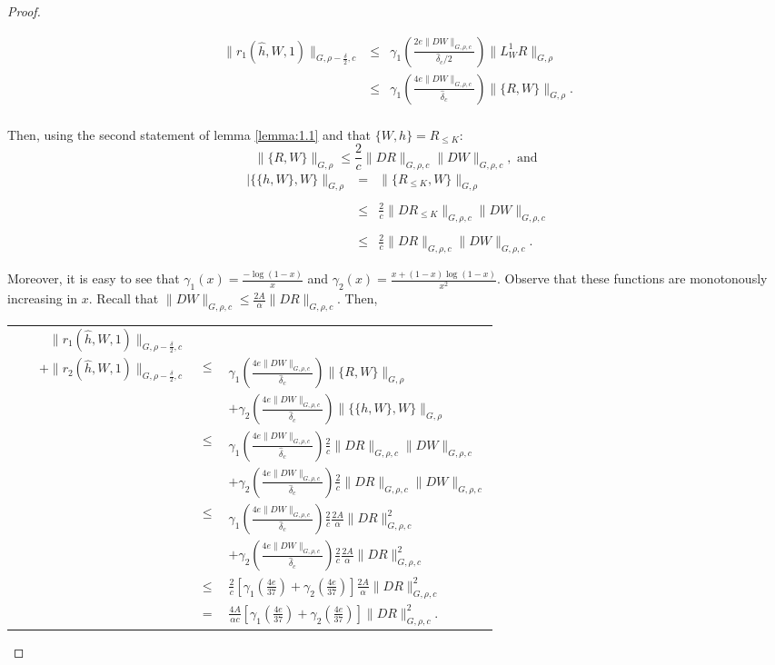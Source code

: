 \begin{proof}
\begin{enumerate}
$$
\begin{array}{rcl}
 \|r_1(\hat h, W,1)\|_{G,\rho-\frac{\delta}{2},c} & \leq & \gamma_1\left(\frac{2e\|DW\|_{G,\rho,c}}{\hat\delta_c/2}\right)\|L_W^1 R\|_{G,\rho}\\
 & \leq & \gamma_1\left(\frac{4e\|DW\|_{G,\rho,c}}{\hat\delta_c}\right)\|\{R,W\}\|_{G,\rho}.\\
\end{array}
$$

Then, using the second statement of lemma \ref{lemma:1.1} and that $\{W,h\} = R_{\leq K}$:
$$\|\{R,W\}\|_{G,\rho}\leq\frac{2}{c}\|DR\|_{G,\rho,c}\|DW\|_{G,\rho,c}, \text{ and }$$
$$\begin{array}{rcl}
|\{\{h,W\},W\}\|_{G,\rho} & = & \displaystyle\|\{R_{\leq K},W\}\|_{G,\rho} \\
\\
&\leq& \displaystyle\frac{2}{c}\|DR_{\leq K}\|_{G,\rho,c}\|DW\|_{G,\rho,c} \\
\\
&\leq& \displaystyle\frac{2}{c}\|DR\|_{G,\rho,c}\|DW\|_{G,\rho,c}.
\end{array}$$

Moreover, it is easy to see that $\gamma_1(x) = \frac{-\log(1-x)}{x}$ and $\gamma_2(x) = \frac{x + (1-x)\log(1-x)}{x^2}$. Observe that these functions are monotonously increasing in $x$. Recall that $\|DW\|_{G,\rho,c} \leq \frac{2A}{\alpha}\|DR\|_{G,\rho,c}$. Then,

\begin{longtable}{rcl}
$\|r_1(\hat h, W,1)\|_{G,\rho-\frac{\delta}{2},c} $\\
$ \qquad +  \|r_2(\hat h, W,1)\|_{G,\rho-\frac{\delta}{2},c}$ & $\leq$ & $\gamma_1\left(\frac{4e\|DW\|_{G,\rho,c}}{\hat\delta_c}\right)\|\{R,W\}\|_{G,\rho}$\\
& & $+ \gamma_2\left(\frac{4e\|DW\|_{G,\rho,c}}{\hat\delta_c}\right)\|\{\{h,W\},W\}\|_{G,\rho}$\\
& $\leq$ & $\gamma_1\left(\frac{4e\|DW\|_{G,\rho,c}}{\hat\delta_c}\right)\frac{2}{c}\|DR\|_{G,\rho,c}\|DW\|_{G,\rho,c}$\\
& & $+ \gamma_2\left(\frac{4e\|DW\|_{G,\rho,c}}{\hat\delta_c}\right)\frac{2}{c}\|DR\|_{G,\rho,c}\|DW\|_{G,\rho,c}$\\
& $\leq$ & $\gamma_1\left(\frac{4e\|DW\|_{G,\rho,c}}{\hat\delta_c}\right)\frac{2}{c}\frac{2A}{\alpha}\|DR\|^2_{G,\rho,c}$\\
& & $+ \gamma_2\left(\frac{4e\|DW\|_{G,\rho,c}}{\hat\delta_c}\right)\frac{2}{c}\frac{2A}{\alpha}\|DR\|^2_{G,\rho,c}$\\
& $\leq$ & $\frac{2}{c}[\gamma_1(\frac{4e}{37}) + \gamma_2(\frac{4e}{37})]\frac{2A}{\alpha}\|DR\|^2_{G,\rho,c}$\\
& $=$ & $\frac{4A}{\alpha c}[\gamma_1(\frac{4e}{37}) + \gamma_2(\frac{4e}{37})]\|DR\|_{G,\rho,c}^2$.\\
\end{longtable}


\end{enumerate}
\end{proof}
